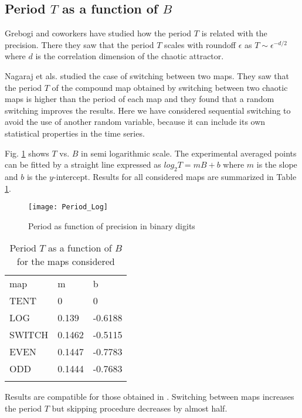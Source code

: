 \subsection{Period $T$ as a function of $B$}

Grebogi and coworkers \cite{Grebogi1988} have studied how the period $T$ is related with the precision.
There they saw that the period $T$ scales with roundoff $\epsilon$ as $T\sim\epsilon^{-d/2}$ where $d$ is the correlation dimension of the chaotic attractor.

Nagaraj et als. \cite{Nagaraj2008} studied the case of switching between two maps.
They saw that the period $T$ of the compound map obtained by switching between two chaotic maps is higher than the period of each map and they found that a random switching improves the results.
Here we have considered sequential switching to avoid the use of another random variable, because it can include its own statistical properties in the time series.

Fig. \ref{fig:period} shows  $T$ vs. $B$ in semi logarithmic scale.
The experimental averaged points can be fitted by a straight line expressed as $log_{2}T=m B + b$ where $m$ is the slope and $b$ is the $y$-intercept.
Results for all considered maps are summarized in Table \ref{tabla:periodos}.

\begin{figure}
\centering	
	\texttt{[image: Period\_Log]}
	\caption{Period as function of precision in binary digits} \label{fig:period}
\end{figure}

\begin{table}
\centering	
	\caption{Period $T$ as a function of $B$ for the maps considered}
	\vspace{1em}
	\begin{tabular}{lll}
		\hline\noalign{\smallskip}
		map & m & b  \\
		\noalign{\smallskip}\hline\noalign{\smallskip}
		TENT&0 & 0 \\
		LOG &0.139 & -0.6188 \\
		SWITCH &0.1462 & -0.5115 \\
		EVEN &0.1447 & -0.7783 \\
		ODD &0.1444 & -0.7683 \\
		\noalign{\smallskip}\hline
	\end{tabular}
	\label{tabla:periodos}	
\end{table}

Results are compatible for those obtained in \cite{Nagaraj2008}.
Switching between maps increases the period $T$ but skipping procedure decreases by almost half.